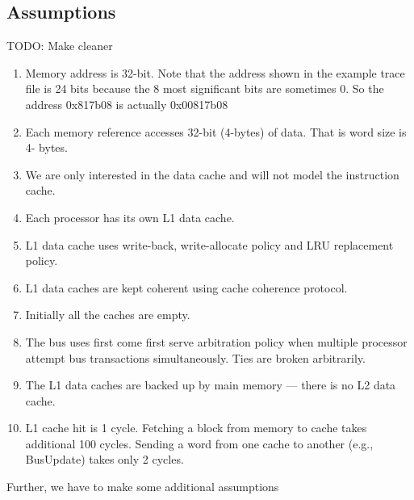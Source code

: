 

\subsection{Assumptions}


TODO: Make cleaner
\begin{enumerate}
    \item Memory address is 32-bit. Note that the address shown in the example trace file is 24 bits
          because the 8 most significant bits are sometimes 0. So the address 0x817b08 is actually 0x00817b08
    \item Each memory reference accesses 32-bit (4-bytes) of data. That is word size is 4- bytes.
    \item We are only interested in the data cache and will not model the instruction cache.
    \item Each processor has its own L1 data cache.
    \item L1 data cache uses write-back, write-allocate policy and LRU replacement policy.
    \item L1 data caches are kept coherent using cache coherence protocol.
    \item Initially all the caches are empty.
    \item The bus uses first come first serve arbitration policy when multiple processor attempt bus
          transactions simultaneously. Ties are broken arbitrarily.
    \item The L1 data caches are backed up by main memory --- there is no L2 data cache.
    \item L1 cache hit is 1 cycle. Fetching a block from memory to cache takes additional 100 cycles.
          Sending a word from one cache to another (e.g., BusUpdate) takes only 2 cycles.
\end{enumerate}

Further, we have to make some additional assumptions

